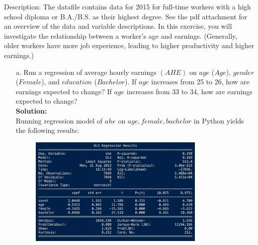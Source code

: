 \documentclass{uofa-eng-assignment}
\begin{document}
 \maketitle
Description: The datafile contains data for 2015 for full-time workers with a
high school diploma or B.A./B.S. as their highest degree. See the pdf
attachment for an overview of the data and variable descriptions. In this
exercise, you will investigate the relationship between a worker's age and
earnings. (Generally, older workers have more job experience, leading to higher
productivity and higher earnings.)

\begin{enumerate}
    \item[a.] Run a regression of average hourly earnings $(AHE)$ on $age$ ($Age$),
        $gender$ ($Female$), and $education$ ($Bachelor$). If $age$ increases from 25
        to 26, how are earnings expected to change? If $age$ increases from 33 to 34,
        how are earnings expected to change? \\ \textbf{Solution:} \\ Running
        regression model of $ahe$ on $age, female, bachelor$ in Python yields the
        following results:
        \begin{figure}[H]
            \centering
            \includegraphics[width=0.80\textwidth]{final-exam-a-1.png}

\end{figure}
\end{enumerate}
\end{document}
